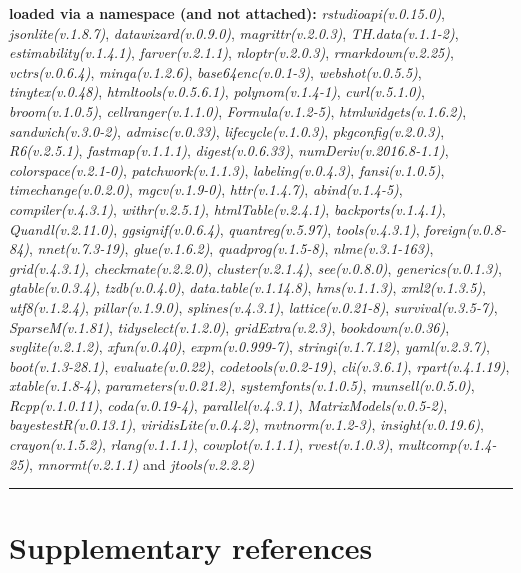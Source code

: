 \documentclass[
  bookmarksnumbered]{article}
\begin{document}
\textbf{loaded via a namespace (and not attached):}
\emph{rstudioapi(v.0.15.0)}, \emph{jsonlite(v.1.8.7)}, \emph{datawizard(v.0.9.0)}, \emph{magrittr(v.2.0.3)}, \emph{TH.data(v.1.1-2)}, \emph{estimability(v.1.4.1)}, \emph{farver(v.2.1.1)}, \emph{nloptr(v.2.0.3)}, \emph{rmarkdown(v.2.25)}, \emph{vctrs(v.0.6.4)}, \emph{minqa(v.1.2.6)}, \emph{base64enc(v.0.1-3)}, \emph{webshot(v.0.5.5)}, \emph{tinytex(v.0.48)}, \emph{htmltools(v.0.5.6.1)}, \emph{polynom(v.1.4-1)}, \emph{curl(v.5.1.0)}, \emph{broom(v.1.0.5)}, \emph{cellranger(v.1.1.0)}, \emph{Formula(v.1.2-5)}, \emph{htmlwidgets(v.1.6.2)}, \emph{sandwich(v.3.0-2)}, \emph{admisc(v.0.33)}, \emph{lifecycle(v.1.0.3)}, \emph{pkgconfig(v.2.0.3)}, \emph{R6(v.2.5.1)}, \emph{fastmap(v.1.1.1)}, \emph{digest(v.0.6.33)}, \emph{numDeriv(v.2016.8-1.1)}, \emph{colorspace(v.2.1-0)}, \emph{patchwork(v.1.1.3)}, \emph{labeling(v.0.4.3)}, \emph{fansi(v.1.0.5)}, \emph{timechange(v.0.2.0)}, \emph{mgcv(v.1.9-0)}, \emph{httr(v.1.4.7)}, \emph{abind(v.1.4-5)}, \emph{compiler(v.4.3.1)}, \emph{withr(v.2.5.1)}, \emph{htmlTable(v.2.4.1)}, \emph{backports(v.1.4.1)}, \emph{Quandl(v.2.11.0)}, \emph{ggsignif(v.0.6.4)}, \emph{quantreg(v.5.97)}, \emph{tools(v.4.3.1)}, \emph{foreign(v.0.8-84)}, \emph{nnet(v.7.3-19)}, \emph{glue(v.1.6.2)}, \emph{quadprog(v.1.5-8)}, \emph{nlme(v.3.1-163)}, \emph{grid(v.4.3.1)}, \emph{checkmate(v.2.2.0)}, \emph{cluster(v.2.1.4)}, \emph{see(v.0.8.0)}, \emph{generics(v.0.1.3)}, \emph{gtable(v.0.3.4)}, \emph{tzdb(v.0.4.0)}, \emph{data.table(v.1.14.8)}, \emph{hms(v.1.1.3)}, \emph{xml2(v.1.3.5)}, \emph{utf8(v.1.2.4)}, \emph{pillar(v.1.9.0)}, \emph{splines(v.4.3.1)}, \emph{lattice(v.0.21-8)}, \emph{survival(v.3.5-7)}, \emph{SparseM(v.1.81)}, \emph{tidyselect(v.1.2.0)}, \emph{gridExtra(v.2.3)}, \emph{bookdown(v.0.36)}, \emph{svglite(v.2.1.2)}, \emph{xfun(v.0.40)}, \emph{expm(v.0.999-7)}, \emph{stringi(v.1.7.12)}, \emph{yaml(v.2.3.7)}, \emph{boot(v.1.3-28.1)}, \emph{evaluate(v.0.22)}, \emph{codetools(v.0.2-19)}, \emph{cli(v.3.6.1)}, \emph{rpart(v.4.1.19)}, \emph{xtable(v.1.8-4)}, \emph{parameters(v.0.21.2)}, \emph{systemfonts(v.1.0.5)}, \emph{munsell(v.0.5.0)}, \emph{Rcpp(v.1.0.11)}, \emph{coda(v.0.19-4)}, \emph{parallel(v.4.3.1)}, \emph{MatrixModels(v.0.5-2)}, \emph{bayestestR(v.0.13.1)}, \emph{viridisLite(v.0.4.2)}, \emph{mvtnorm(v.1.2-3)}, \emph{insight(v.0.19.6)}, \emph{crayon(v.1.5.2)}, \emph{rlang(v.1.1.1)}, \emph{cowplot(v.1.1.1)}, \emph{rvest(v.1.0.3)}, \emph{multcomp(v.1.4-25)}, \emph{mnormt(v.2.1.1)} and \emph{jtools(v.2.2.2)}

\begin{center}\rule{0.5\linewidth}{0.5pt}\end{center}

\hypertarget{refs}{%
\section{Supplementary references}\label{refs}}

\begin{multicols}{2}
\AtNextBibliography{\footnotesize}
\printbibliography[heading=none]
\normalsize
\end{multicols}

\def\printbibliography{}

\printbibliography
\end{document}
